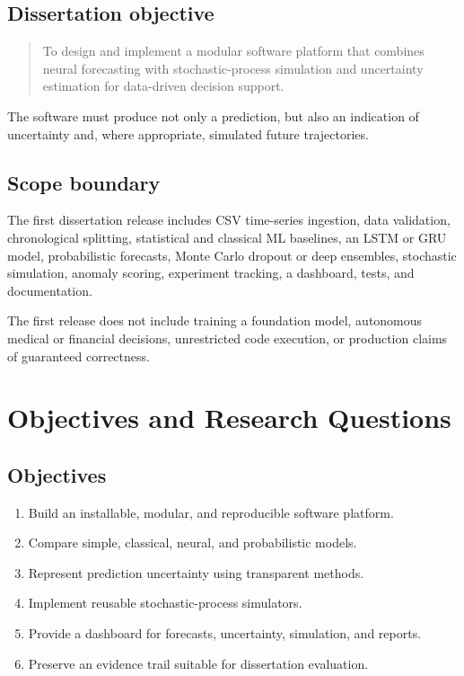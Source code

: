 \documentclass[11pt,a4paper]{report}
\begin{document}
\section{Dissertation objective}

\begin{quote}
To design and implement a modular software platform that combines neural forecasting with stochastic-process simulation and uncertainty estimation for data-driven decision support.
\end{quote}

The software must produce not only a prediction, but also an indication of uncertainty and, where appropriate, simulated future trajectories.

\section{Scope boundary}

The first dissertation release includes CSV time-series ingestion, data validation, chronological splitting, statistical and classical ML baselines, an LSTM or GRU model, probabilistic forecasts, Monte Carlo dropout or deep ensembles, stochastic simulation, anomaly scoring, experiment tracking, a dashboard, tests, and documentation.

The first release does not include training a foundation model, autonomous medical or financial decisions, unrestricted code execution, or production claims of guaranteed correctness.

\chapter{Objectives and Research Questions}

\section{Objectives}
\begin{enumerate}
\item Build an installable, modular, and reproducible software platform.
\item Compare simple, classical, neural, and probabilistic models.
\item Represent prediction uncertainty using transparent methods.
\item Implement reusable stochastic-process simulators.
\item Provide a dashboard for forecasts, uncertainty, simulation, and reports.
\item Preserve an evidence trail suitable for dissertation evaluation.
\end{enumerate}
\end{document}

